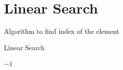 \documentclass{article}
\begin{document}
\section{Linear Search}
Algorithm to find index of the element
\begin{algorithm}
    \caption{Linear Search}
 \Return $-1$\
\end{algorithm}
\end{document}

